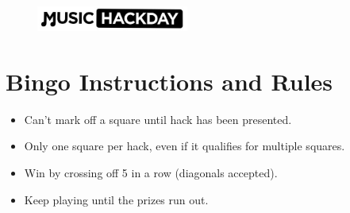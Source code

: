 


\begin{figure}[h]
    \centering
    \includegraphics[width=5cm]{./mhdlogo.jpg}
\end{figure}


\section*{Bingo Instructions and Rules}
\begin{itemize}
\item Can't mark off a square until hack has been presented.
\item Only one square per hack, even if it qualifies for multiple squares.
\item Win by crossing off 5 in a row (diagonals accepted).
\item Keep playing until the prizes run out.
\end{itemize}

\vspace{0.5cm}


\begin{center}
\end{center}